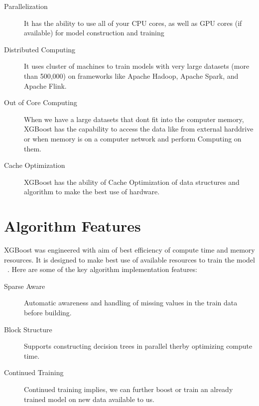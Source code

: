 \begin{description}
\item[Parallelization]

It has the ability to use all of your CPU cores, as well as GPU cores (if
available) for model construction and training

\item[Distributed Computing]

It uses cluster of machines to train models with very large datasets (more than
500,000) on frameworks like Apache Hadoop, Apache Spark, and Apache Flink.

\item[Out of Core Computing]

When we have a large datasets that dont fit into the computer memory, XGBoost
has the capability to access the data  like from external harddrive or when
memory is on a computer network and perform Computing on them.

\item[Cache Optimization]

XGBoost has the ability of Cache Optimization of data structures and algorithm
to make the best use of hardware.

\end{description}


\section{Algorithm Features} 

XGBoost was engineered with aim of best efficiency of compute time and memory
resources. It is designed to make best use of available resources to train the
model ~\cite{hid-sp18-401-XGBoost-MLmastery}. Here are some of the key algorithm
implementation features:

\begin{description}

\item[Sparse Aware]

Automatic awareness and handling of missing values in the train data before 
building.

\item[Block Structure]

Supports constructing decision trees in parallel therby optimizing compute
time.

\item[Continued Training] 

Continued training implies, we can further boost or train an already trained
model on new data available to us.

\end{description}


